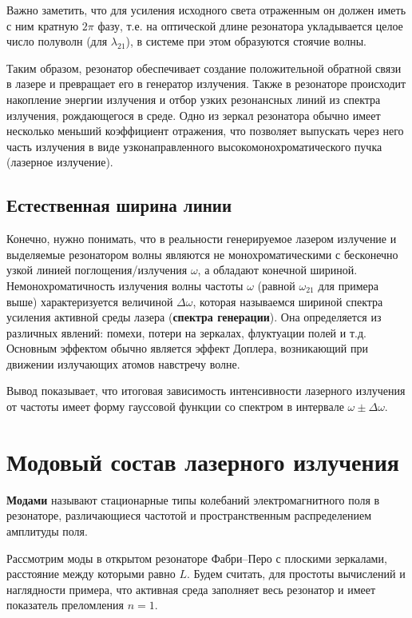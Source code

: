 \documentclass[12pt]{kiarticle}
\begin{document}
Важно заметить, что для усиления исходного света отраженным он должен иметь с ним кратную $ 2\pi $ фазу, т.е. на оптической длине резонатора укладывается целое число полуволн (для $ \lambda_{21} $), в системе при этом образуются стоячие волны. 

Таким образом, резонатор обеспечивает
создание положительной обратной связи в лазере и превращает его
в генератор излучения. Также в резонаторе происходит накопление
энергии излучения и отбор узких резонансных линий из спектра
излучения, рождающегося в среде. Одно из зеркал резонатора обычно
имеет несколько меньший коэффициент отражения, что позволяет
выпускать через него часть излучения в виде узконаправленного
высокомонохроматического пучка (лазерное излучение).

\subsection{Естественная ширина линии}

Конечно, нужно понимать, что в реальности генерируемое лазером излучение и выделяемые резонатором волны являются не монохроматическими с бесконечно узкой линией поглощения/излучения $ \omega $, а обладают конечной шириной. Немонохроматичность излучения волны частоты $ \omega $ (равной $ \omega_{21} $ для примера выше) характеризуется величиной $ \Delta \omega $, которая называемся шириной спектра усиления активной среды лазера (\textbf{спектра генерации}). Она определяется из различных явлений: помехи, потери на зеркалах, флуктуации полей и т.д. Основным эффектом обычно является эффект Доплера, возникающий при движении излучающих атомов навстречу волне. 

Вывод показывает, что итоговая зависимость интенсивности лазерного излучения от частоты имеет форму гауссовой функции со спектром в интервале $ \omega \pm \Delta \omega $. 

\section{Модовый состав лазерного излучения}

\textbf{Модами} называют стационарные типы колебаний электромагнитного поля в резонаторе, различающиеся частотой и пространственным распределением амплитуды поля.

Рассмотрим моды в открытом резонаторе Фабри–Перо с плоскими
зеркалами, расстояние между которыми равно $ L $. Будем считать, для
простоты вычислений и наглядности примера, что активная среда заполняет весь резонатор и имеет показатель преломления $ n= 1 $.
\end{document}
